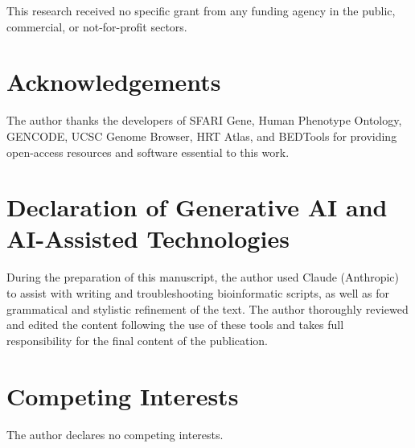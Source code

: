 \documentclass[11pt, a4paper]{article}
\begin{document}
This research received no specific grant from any funding agency in the public, commercial, or not-for-profit sectors.

\section*{Acknowledgements}

The author thanks the developers of SFARI Gene, Human Phenotype Ontology, GENCODE, UCSC Genome Browser, HRT Atlas, and BEDTools for providing open-access resources and software essential to this work.

\section*{Declaration of Generative AI and AI-Assisted Technologies}

During the preparation of this manuscript, the author used Claude (Anthropic) to assist with writing and troubleshooting bioinformatic scripts, as well as for grammatical and stylistic refinement of the text. The author thoroughly reviewed and edited the content following the use of these tools and takes full responsibility for the final content of the publication.

\section*{Competing Interests}

The author declares no competing interests.

\FloatBarrier
\end{document}
